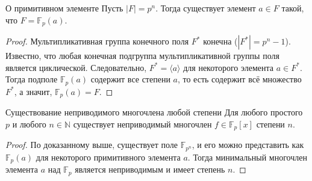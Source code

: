 \begin{Proposition}{О примитивном элементе}{}
	Пусть $|F| = p^n$. Тогда существует элемент $a \in F$ такой, что $F = \mathbb{F}_p(a)$.
\end{Proposition}

\begin{proof}
	Мультипликативная группа конечного поля $F^*$ конечна ($|F^*| = p^n - 1$). Известно, что любая конечная подгруппа мультипликативной группы поля является циклической. Следовательно, $F^* = \langle a \rangle$ для некоторого элемента $a \in F^*$. Тогда подполе $\mathbb{F}_p(a)$ содержит все степени $a$, то есть содержит всё множество $F^*$, а значит, $\mathbb{F}_p(a) = F$.
\end{proof}

\begin{Corollary}{Существование неприводимого многочлена любой степени}{}
	Для любого простого $p$ и любого $n \in \mathbb{N}$ существует неприводимый многочлен $f \in \mathbb{F}_p[x]$ степени $n$.
\end{Corollary}

\begin{proof}
	По доказанному выше, существует поле $\mathbb{F}_{p^n}$, и его можно представить как $\mathbb{F}_p(a)$ для некоторого примитивного элемента $a$. Тогда минимальный многочлен элемента $a$ над $\mathbb{F}_p$ является неприводимым и имеет степень $n$.
\end{proof}

